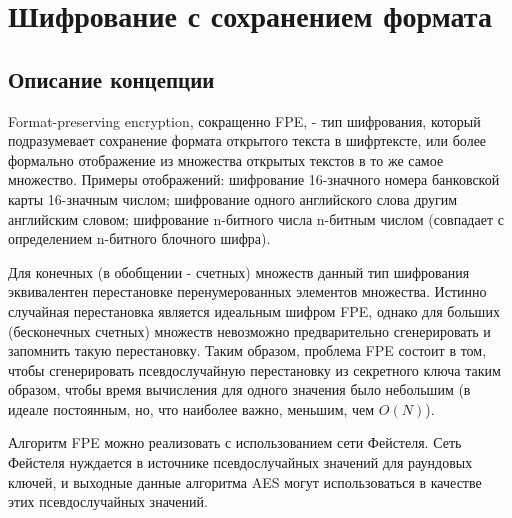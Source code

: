 \documentclass[utf8x, 14pt]{G7-32} %
\begin{document}
\frontmatter %

\maketitle %


\begin{executors}
\end{executors}

\tableofcontents %
 



\mainmatter %

\chapter{Шифрование с сохранением формата}

\section{Описание концепции}
Format-preserving encryption, сокращенно FPE, - тип шифрования, который подразумевает сохранение формата открытого текста в шифртексте, или более формально отображение из множества открытых текстов в то же самое множество. Примеры отображений: шифрование 16-значного номера банковской карты 16-значным числом; шифрование одного английского слова другим английским словом; шифрование n-битного числа n-битным числом (совпадает с определением n-битного блочного шифра).


Для конечных (в обобщении - счетных) множеств данный тип шифрования эквивалентен перестановке перенумерованных элементов множества. Истинно случайная перестановка является идеальным шифром FPE, однако для больших (бесконечных счетных) множеств невозможно предварительно сгенерировать и запомнить такую перестановку. Таким образом, проблема FPE состоит в том, чтобы сгенерировать псевдослучайную перестановку из секретного ключа таким образом, чтобы время вычисления для одного значения было небольшим (в идеале постоянным, но, что наиболее важно, меньшим, чем $O(N)$).


Алгоритм FPE можно реализовать с использованием сети Фейстеля. Сеть Фейстеля нуждается в источнике псевдослучайных значений для раундовых ключей, и выходные данные алгоритма AES могут использоваться в качестве этих псевдослучайных значений. 
\end{document}

